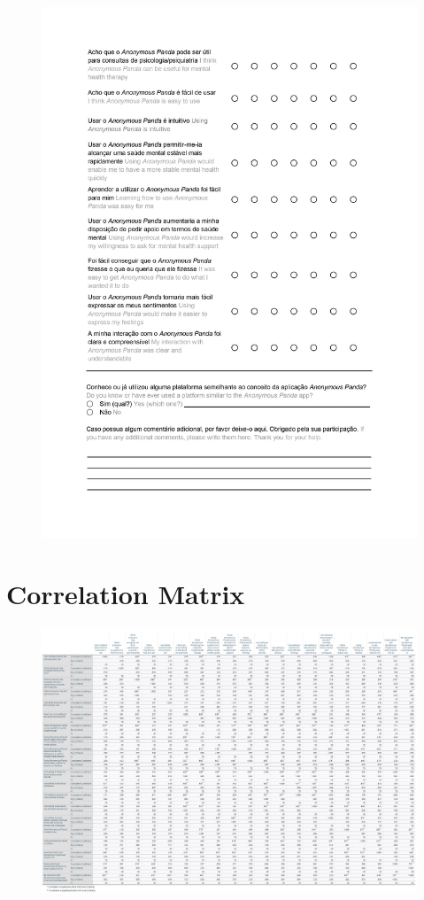\begin{figure}[h!]
\centering
\includegraphics[width=\textwidth]{figures/02_04.jpg}
\end{figure}

\clearpage
\section{Correlation Matrix}
\label{appendix:correlations}
\begin{figure}[h!]
\centering
\includegraphics[width=1.5\textwidth,angle=90]{figures/correlations.png}
\end{figure}